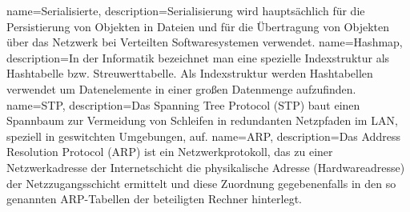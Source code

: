 {
  name=Serialisierte,
  description={Serialisierung wird hauptsächlich für die Persistierung von Objekten in Dateien und für die Übertragung von Objekten über das Netzwerk bei Verteilten Softwaresystemen verwendet.}
}
{
  name=Hashmap,
  description={In der Informatik bezeichnet man eine spezielle Indexstruktur als Hashtabelle bzw. Streuwerttabelle. Als Indexstruktur werden Hashtabellen verwendet um Datenelemente in einer großen Datenmenge aufzufinden.}
}
{
  name=STP,
  description={Das Spanning Tree Protocol (STP) baut einen Spannbaum zur Vermeidung von Schleifen in redundanten Netzpfaden im LAN, speziell in geswitchten Umgebungen, auf.}
}
{
  name=ARP,
  description={Das Address Resolution Protocol (ARP) ist ein Netzwerkprotokoll, das zu einer Netzwerkadresse der Internetschicht die physikalische Adresse (Hardwareadresse) der Netzzugangsschicht ermittelt und diese Zuordnung gegebenenfalls in den so genannten ARP-Tabellen der beteiligten Rechner hinterlegt.}
}

